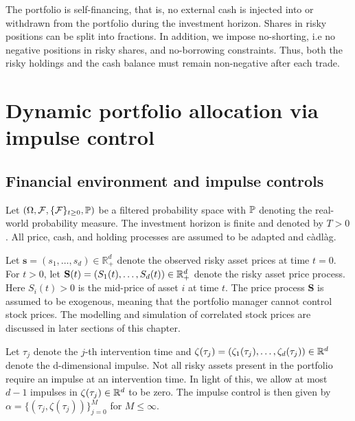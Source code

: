 The portfolio is self-financing, that is, no external cash is injected into or withdrawn from the portfolio during the investment horizon. Shares in risky positions can be split into fractions. In addition, we impose no-shorting, i.e no negative positions in risky shares, and no-borrowing constraints. Thus, both the risky holdings and the cash balance must remain non-negative after each trade.

\section{Dynamic portfolio allocation via impulse control}
\subsection{Financial environment and impulse controls}
Let $(\Omega, \mathcal{F}, \{\mathcal{F}\}_{t \geq 0}, \mathbb{P})$ be a filtered probability space with $\mathbb{P}$ denoting the real-world probability measure. The investment horizon is finite and denoted by $T>0$. All price, cash, and holding processes are assumed to be adapted and càdlàg. 

Let $\mathbf{s}=(s_1, \ldots, s_d) \in \mathbb R_+^d$ denote the observed risky asset prices at time $t=0$. For $t>0$, let $\mathbf S(t) = (S_1(t), \ldots, S_d(t))\in \mathbb{R}_+^d$ denote the risky asset price process. Here $S_i(t)>0$ is the mid-price of asset $i$ at time $t$. The price process $\mathbf S$ is assumed to be exogenous, meaning that the portfolio manager cannot control stock prices. The modelling and simulation of correlated stock prices are discussed in later sections of this chapter. 

Let $\tau_j$ denote the $j$-th intervention time and $\zeta(\tau_j)=(\zeta_1(\tau_j), \ldots, \zeta_d(\tau_j)) \in \mathbb{R}^d$ denote the d-dimensional impulse. Not all risky assets present in the portfolio require an impulse at an intervention time. In light of this, we allow at most $d-1$ impulses in $\zeta(\tau_j)\in \mathbb{R}^d$ to be zero. The impulse control is then given by $\alpha = \{(\tau_j, \zeta(\tau_j))\}_{j = 0}^M$ for $M\leq \infty$. 

